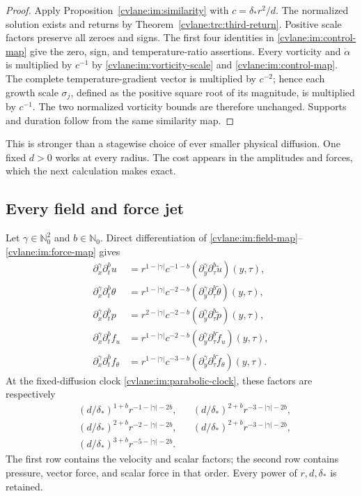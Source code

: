\begin{proof}
Apply Proposition~\ref{cvlane:im:similarity} with
$c=\delta_*r^2/d$.  The normalized solution exists and returns by
Theorem~\ref{cvlane:trc:third-return}.  Positive scale factors preserve all
zeroes and signs.  The first four identities in \eqref{cvlane:im:control-map}
give the zero, sign, and temperature-ratio assertions.  Every vorticity
and $\dot\alpha$ is multiplied by $c^{-1}$ by
\eqref{cvlane:im:vorticity-scale} and \eqref{cvlane:im:control-map}.  The complete
temperature-gradient vector is multiplied by $c^{-2}$; hence each
growth scale $\sigma_j$, defined as the positive square root of its
magnitude, is multiplied by $c^{-1}$.  The two normalized vorticity
bounds are therefore unchanged.  Supports and duration follow from the
same similarity map.
\end{proof}

This is stronger than a stagewise choice of ever smaller physical
diffusion.  One fixed $d>0$ works at every radius.  The cost appears in
the amplitudes and forces, which the next calculation makes exact.

\subsection{Every field and force jet}

Let $\gamma\in\mathbb N_0^2$ and $b\in\mathbb N_0$.  Direct
differentiation of \eqref{cvlane:im:field-map}--\eqref{cvlane:im:force-map} gives
\begin{align}
 \partial_x^\gamma\partial_t^b u
 &=r^{1-|\gamma|}c^{-1-b}
   (\partial_y^\gamma\partial_\tau^b\widetilde u)(y,\tau),
 \label{cvlane:im:u-jets}\\
 \partial_x^\gamma\partial_t^b \theta
 &=r^{1-|\gamma|}c^{-2-b}
   (\partial_y^\gamma\partial_\tau^b\widetilde\theta)(y,\tau),
 \label{cvlane:im:theta-jets}\\
 \partial_x^\gamma\partial_t^b p
 &=r^{2-|\gamma|}c^{-2-b}
   (\partial_y^\gamma\partial_\tau^b\widetilde p)(y,\tau),
 \label{cvlane:im:p-jets}\\
 \partial_x^\gamma\partial_t^b f_u
 &=r^{1-|\gamma|}c^{-2-b}
   (\partial_y^\gamma\partial_\tau^b\widetilde f_u)(y,\tau),
 \label{cvlane:im:fu-jets}\\
 \partial_x^\gamma\partial_t^b f_\theta
 &=r^{1-|\gamma|}c^{-3-b}
   (\partial_y^\gamma\partial_\tau^b\widetilde f_\theta)(y,\tau).
 \label{cvlane:im:ftheta-jets}
\end{align}
At the fixed-diffusion clock \eqref{cvlane:im:parabolic-clock}, these factors
are respectively
\begin{align}
 &(d/\delta_*)^{1+b}r^{-1-|\gamma|-2b},
 &&(d/\delta_*)^{2+b}r^{-3-|\gamma|-2b},
 \label{cvlane:im:state-powers}\\
 &(d/\delta_*)^{2+b}r^{-2-|\gamma|-2b},
 &&(d/\delta_*)^{2+b}r^{-3-|\gamma|-2b},
 \nonumber\\
 &(d/\delta_*)^{3+b}r^{-5-|\gamma|-2b}.
 \label{cvlane:im:force-powers}
\end{align}
The first row contains the velocity and scalar factors; the second row
contains pressure, vector force, and scalar force in that order.
Every power of $r,d,\delta_*$ is retained.

